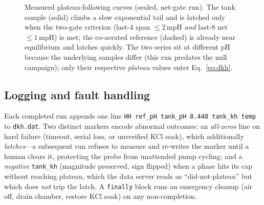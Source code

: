\documentclass[11pt]{article}
\begin{document}
\begin{figure}[t]
\centering
{}
\caption{Measured plateau-following curves (sealed, net-gate run). The tank
sample (solid) climbs a slow exponential tail and is latched only when the
two-gate criterion (last-4 span $\le 2$\,mpH \emph{and} last-8 net $\le 1$\,mpH)
is met; the co-aerated reference (dashed) is already near equilibrium and latches
quickly. The two series sit at different pH because the underlying samples differ
(this run predates the null campaign); only their respective \emph{plateau}
values enter Eq.~\eqref{eq:dkh}.}
\label{fig:plateau}
\end{figure}

\subsection{Logging and fault handling}
Each completed run appends one line
\texttt{HH ref\_pH tank\_pH 8.448 tank\_kh temp} to \texttt{dkh.dat}. Two
distinct markers encode abnormal outcomes: an \emph{all-zeros} line on hard
failure (timeout, serial loss, or unverified KCl soak), which additionally
\emph{latches}---a subsequent run refuses to measure and re-writes the marker
until a human clears it, protecting the probe from unattended pump cycling; and
a \emph{negative} \texttt{tank\_kh} (magnitude preserved, sign flipped) when a
phase hits its cap without reaching plateau, which the data server reads as
``did-not-plateau'' but which does \emph{not} trip the latch. A \texttt{finally}
block runs an emergency cleanup (air off, drain chamber, restore KCl soak) on
any non-completion.
\end{document}

